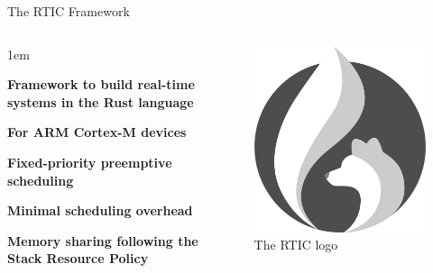 \begin{frame}{The RTIC Framework}
    \begin{columns}
        \begin{itemize-size}{1em}
            \item \textbf{Framework to build real-time systems in the Rust language}
            \item \textbf{For ARM Cortex-M devices}
            \item \textbf{Fixed-priority preemptive scheduling}
            \item \textbf{Minimal scheduling overhead}
            \item \textbf{Memory sharing following the Stack Resource Policy}
        \end{itemize-size}

        \begin{figure}
            \centering
            \includegraphics[scale=0.35]{pictures/RTIC.png}
            \caption{The RTIC logo}
        \end{figure}
    \end{columns}
\end{frame}

